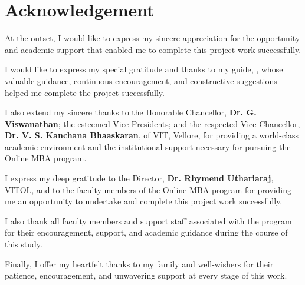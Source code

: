 \chapter*{Acknowledgement}

At the outset, I would like to express my sincere appreciation for the opportunity and academic support that enabled me to complete this project work successfully.

I would like to express my special gratitude and thanks to my guide, \textbf{\guidename}, whose valuable guidance, continuous encouragement, and constructive suggestions helped me complete the project successfully.

I also extend my sincere thanks to the Honorable Chancellor, \textbf{Dr. G. Viswanathan}; the esteemed Vice-Presidents; and the respected Vice Chancellor, \textbf{Dr. V. S. Kanchana Bhaaskaran}, of VIT, Vellore, for providing a world-class academic environment and the institutional support necessary for pursuing the Online MBA program.

I express my deep gratitude to the Director, \textbf{Dr. Rhymend Uthariaraj}, VITOL, and to the faculty members of the Online MBA program for providing me an opportunity to undertake and complete this project work successfully.

I also thank all faculty members and support staff associated with the program for their encouragement, support, and academic guidance during the course of this study.

Finally, I offer my heartfelt thanks to my family and well-wishers for their patience, encouragement, and unwavering support at every stage of this work.
